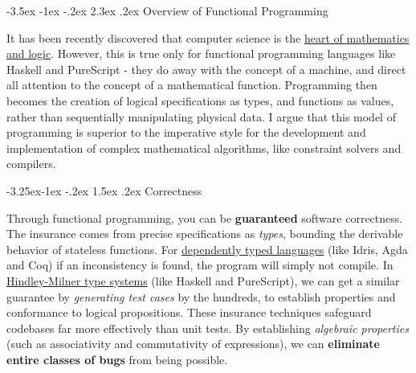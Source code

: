 \documentclass[11pt,pressrelease]{newlfm} %
\makeatletter
\newcounter{section}
\newcounter{subsection}[section]
\renewcommand\section{\@startsection {section}{1}{\z@}%
                                   {-3.5ex \@plus -1ex \@minus -.2ex}%
                                   {2.3ex \@plus.2ex}%
                                   {\normalfont\Large\bfseries}}
\newcommand\subsection{\@startsection{subsection}{2}{\z@}%
                                     {-3.25ex\@plus -1ex \@minus -.2ex}%
                                     {1.5ex \@plus .2ex}%
                                     {\normalfont\large\bfseries}}
\makeatother
\begin{document}
\begin{newlfm}


\begin{singlespace} %

\section{Overview of Functional Programming}

It has been recently discovered that computer science is the
\href{http://ncatlab.org/nlab/show/relation+between+type+theory+and+category+theory}{heart of mathematics and logic}.
However, this is true only for functional programming languages like Haskell and PureScript -
they do away with the concept of a machine, and direct all attention to the concept of a
mathematical function. Programming then becomes the creation of logical specifications as types, and
functions as values, rather than sequentially manipulating physical data. I argue that this model
of programming is superior to the imperative style for the development and implementation of
complex mathematical algorithms, like constraint solvers and compilers.

\subsection{Correctness}

Through functional programming, you can be \textbf{guaranteed} software correctness. The insurance comes from
precise specifications as \textit{types}, bounding the derivable behavior of stateless functions. For
\href{http://ncatlab.org/nlab/show/Martin-L%C3%B6f+dependent+type+theory}{dependently typed languages}
(like Idris, Agda and Coq) if an
inconsistency is found, the program will simply not compile. In
\href{http://en.wikipedia.org/wiki/Hindley%E2%80%93Milner_type_system}{Hindley-Milner type systems}
(like Haskell and PureScript), we can get a similar guarantee by \textit{generating test cases} by the hundreds, to
establish properties and conformance to logical propositions. These insurance techniques safeguard codebases far
more effectively than unit tests. By establishing \textit{algebraic properties} (such as associativity and
commutativity of expressions), we can \textbf{eliminate entire classes of bugs}
from being possible.


\end{singlespace}
\end{newlfm}
\end{document}
